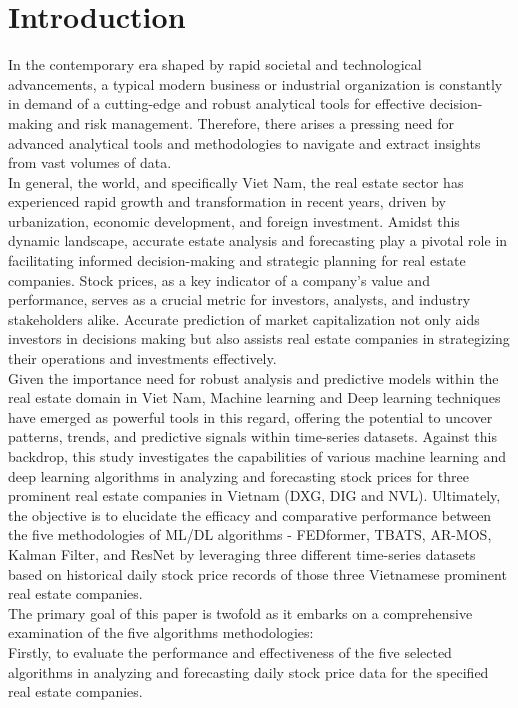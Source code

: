 \documentclass[conference]{IEEEtran}
\begin{document}
\section{\textbf{Introduction}}
In the contemporary era shaped by rapid societal and technological advancements, a typical modern business or industrial organization is constantly in demand of a cutting-edge and robust analytical tools for effective decision-making and risk management. Therefore, there arises a pressing need for advanced analytical tools and methodologies to navigate and extract insights from vast volumes of data.\\ 
In general, the world, and specifically Viet Nam, the real estate sector has experienced rapid growth and transformation in recent years, driven by urbanization, economic development, and foreign investment. Amidst this dynamic landscape, accurate estate analysis and forecasting play a pivotal role in facilitating informed decision-making and strategic planning for real estate companies. Stock prices, as a key indicator of a company's value and performance, serves as a crucial metric for investors, analysts, and industry stakeholders alike. Accurate prediction of market capitalization not only aids investors in decisions making but also assists real estate companies in strategizing their operations and investments effectively. \\
Given the importance need for robust analysis and predictive models within the real estate domain in Viet Nam, Machine learning and Deep learning techniques have emerged as powerful tools in this regard, offering the potential to uncover patterns, trends, and predictive signals within time-series datasets. Against this backdrop, this study investigates the capabilities of various machine learning and deep learning algorithms in analyzing and forecasting stock prices for three prominent real estate companies in Vietnam (DXG, DIG and NVL). Ultimately, the objective is to elucidate the efficacy and comparative performance between the five methodologies of ML/DL algorithms - FEDformer, TBATS, AR-MOS, Kalman Filter, and ResNet by leveraging three different time-series datasets based on historical daily stock price records of those three Vietnamese prominent real estate companies. \\
The primary goal of this paper is twofold as it embarks on a comprehensive examination of the five algorithms methodologies: \\
Firstly, to evaluate the performance and effectiveness of the five selected algorithms in analyzing and forecasting daily stock price data for the specified real estate companies.
\end{document}
